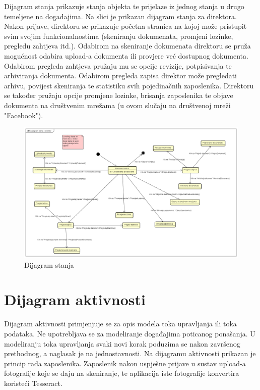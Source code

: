 			Dijagram stanja prikazuje stanja objekta te prijelaze iz jednog stanja u drugo temeljene na dogadajima. Na slici je prikazan dijagram stanja za direktora. Nakon prijave, direktoru se prikazuje početna stranica na kojoj može pristupit svim svojim funkcionalnostima (skeniranju dokumenata, promjeni lozinke, pregledu zahtjeva itd.). Odabirom na skeniranje dokumenata direktoru se pruža mogućnost odabira upload-a dokumenta ili provjere već dostupnog dokumenta. Odabirom pregleda zahtjeva pružaju mu se opcije revizije, potpisivanja te arhiviranja dokumenta. Odabirom pregleda zapisa direktor može pregledati arhivu, povijest skeniranja te statistiku svih pojedinačnih zaposlenika. Direktoru se također pružaju opcije promjene lozinke, brisanja zaposlenika te objave dokumenta na društvenim mrežama (u ovom slučaju na društvenoj mreži "Facebook").
			
			\begin{figure}[H]
				\includegraphics[scale=0.35]{slike/DijagramStanja - Direktor.png} %
				\centering
				\caption{Dijagram stanja}
				\label{fig:promjene}
			\end{figure}

			\eject 
		
		\section{Dijagram aktivnosti}
			
			
			Dijagram aktivnosti primjenjuje se za opis modela toka upravljanja ili toka podataka. Ne upotrebljava se za modeliranje događajima poticanog ponašanja. U modeliranju toka upravljanja svaki novi korak poduzima se nakon završenog prethodnog, a naglasak je na jednostavnosti. Na dijagramu aktivnosti prikazan je princip rada zaposlenika. Zaposlenik nakon uspješne prijave u sustav upload-a fotografije koje se daju na skeniranje, te aplikacija iste fotografije konvertira koristeći Tesseract.

